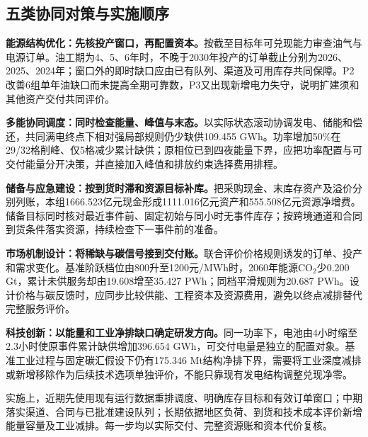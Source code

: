 \subsection{五类协同对策与实施顺序}
\textbf{能源结构优化：先核投产窗口，再配置资本。}按截至目标年可兑现能力审查油气与电源订单。油工期为4、5、6年时，不晚于2030年投产的订单截止分别为2026、2025、2024年；窗口外的即时缺口应由已有队列、渠道及可用库存共同保障。P2改善6组单年油缺口而未提高全期可靠数，P3又出现新增电力失守，说明扩建须和其他资产交付共同评价。

\textbf{多能协同调度：同时检查能量、峰值与末态。}以实际状态滚动协调发电、储能和偿还，共同满电终点下相对强局部规则仍少缺供109.455 GWh。功率增加50\%在29/32格削峰、仅5格减少累计缺供；原相位已到四夜能量下界，应把功率配置与可交付能量分开决策，并直接加入峰值和排放约束选择费用排程。

\textbf{储备与应急建设：按到货时滞和资源目标补库。}把采购现金、末库存资产及溢价分别列账，本组1666.523亿元现金形成1111.016亿元资产和555.508亿元资源净增费。储备目标同时核对最近事件前、固定初始与同小时无事件库存；按跨境通道和合同到货条件落实资源，持续检查下一事件前的准备。

\textbf{市场机制设计：将稀缺与碳信号接到交付账。}联合评价价格规则诱发的订单、投产和需求变化。基准阶跃档位由800升至1200元/MWh时，2060年能源CO$_2$少0.200 Gt，累计未供服务却由19.608增至35.427 PWh；同档平滑规则为20.687 PWh。设计价格与碳反馈时，应同步比较供能、工程资本及资源费用，避免以终点减排替代完整服务评价。

\textbf{科技创新：以能量和工业净排缺口确定研发方向。}同一功率下，电池由4小时缩至2.3小时使原事件累计缺供增加396.654 GWh，可交付电量是独立的配置对象。基准工业过程与固定碳汇假设下仍有175.346 Mt结构净排下界，需要将工业深度减排或新增移除作为后续技术选项单独评价，不能只靠现有发电结构调整兑现净零。

实施上，近期先使用现有运行数据重排调度、明确库存目标和有效订单窗口；中期落实渠道、合同与已批准建设队列；长期依据地区负荷、到货和技术成本评价新增能量容量及工业减排。每一步均以实际交付、完整资源账和资本代价复核。
